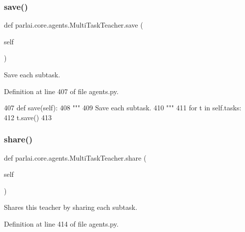 \subsubsection{\texorpdfstring{save()}{save()}}
{\footnotesize\ttfamily def parlai.\+core.\+agents.\+Multi\+Task\+Teacher.\+save (\begin{DoxyParamCaption}\item[{}]{self }\end{DoxyParamCaption})}

\begin{DoxyVerb}Save each subtask.
\end{DoxyVerb}
 

Definition at line 407 of file agents.\+py.


\begin{DoxyCode}
407     \textcolor{keyword}{def }save(self):
408         \textcolor{stringliteral}{"""}
409 \textcolor{stringliteral}{        Save each subtask.}
410 \textcolor{stringliteral}{        """}
411         \textcolor{keywordflow}{for} t \textcolor{keywordflow}{in} self.tasks:
412             t.save()
413 
\end{DoxyCode}
\mbox{\label{classparlai_1_1core_1_1agents_1_1MultiTaskTeacher_adbd1854cad9eb58ba1c7736b44bf5e96}} 
\subsubsection{\texorpdfstring{share()}{share()}}
{\footnotesize\ttfamily def parlai.\+core.\+agents.\+Multi\+Task\+Teacher.\+share (\begin{DoxyParamCaption}\item[{}]{self }\end{DoxyParamCaption})}

\begin{DoxyVerb}Shares this teacher by sharing each subtask.
\end{DoxyVerb}
 

Definition at line 414 of file agents.\+py.


